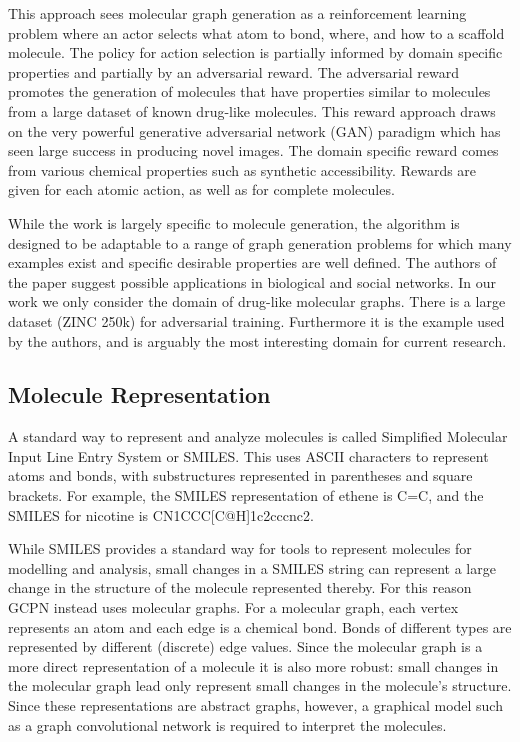 \documentclass{article}
\begin{document}
This approach sees molecular graph generation as a reinforcement learning problem where an actor selects what atom to bond, where, and how to a scaffold molecule. The policy for action selection is partially informed by domain specific properties and partially by an adversarial reward. The adversarial reward promotes the generation of molecules that have properties similar to molecules from a large dataset of known drug-like molecules. This reward approach draws on the very powerful generative adversarial network (GAN) paradigm which has seen large success in producing novel images. The domain specific reward comes from various chemical properties such as synthetic accessibility. Rewards are given for each atomic action, as well as for complete molecules.

While the work is largely specific to molecule generation, the algorithm is designed to be adaptable to a range of graph generation problems for which many examples exist and specific desirable properties are well defined. The authors of the paper suggest possible applications in biological and social networks.
In our work we only consider the domain of drug-like molecular graphs. There is a large dataset (ZINC 250k) for adversarial training. Furthermore it is the example used by the authors, and is arguably the most interesting domain for current research.
\subsection{Molecule Representation}
A standard way to represent and analyze molecules is called Simplified Molecular Input Line Entry System or SMILES. This uses ASCII characters to represent atoms and bonds, with substructures represented in parentheses and square brackets. For example, the SMILES representation of ethene is C=C, and the SMILES for nicotine is CN1CCC[C@H]1c2cccnc2.

While SMILES provides a standard way for tools to represent molecules for modelling and analysis, small changes in a SMILES string can represent a large change in the structure of the molecule represented thereby. For this reason GCPN instead uses molecular graphs. For a molecular graph, each vertex represents an atom and each edge is a chemical bond. Bonds of different types are represented by different (discrete) edge values. Since the molecular graph is a more direct representation of a molecule it is also more robust: small changes in the molecular graph lead only represent small changes in the molecule's structure. Since these representations are abstract graphs, however, a graphical model such as a graph convolutional network is required to interpret the molecules.
\end{document}
